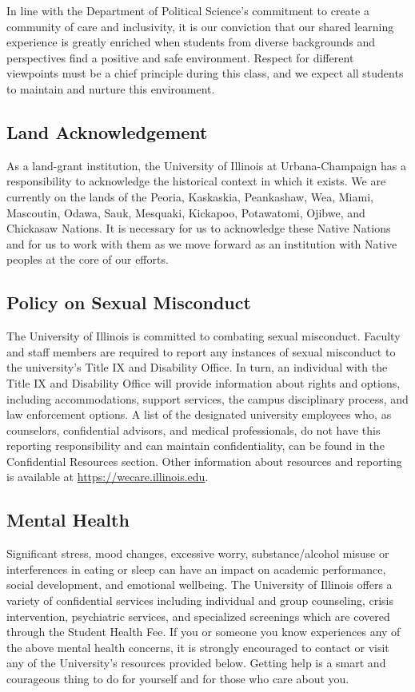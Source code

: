 \documentclass[11pt,letterpaper]{article}
\begin{document}
In line with the Department of Political Science's commitment to create a community of care and inclusivity, it is our conviction that our shared learning experience is greatly enriched when students from diverse backgrounds and perspectives find a positive and safe environment. Respect for different viewpoints must be a chief principle during this class, and we expect all students to maintain and nurture this environment.

\subsection*{Land Acknowledgement}

As a land-grant institution, the University of Illinois at Urbana-Champaign has a responsibility to acknowledge the historical context in which it exists. We are currently on the lands of the Peoria, Kaskaskia, Peankashaw, Wea, Miami, Mascoutin, Odawa, Sauk, Mesquaki, Kickapoo, Potawatomi, Ojibwe, and Chickasaw Nations. It is necessary for us to acknowledge these Native Nations and for us to work with them as we move forward as an institution with Native peoples at the core of our efforts.

\subsection*{Policy on Sexual Misconduct}

The University of Illinois is committed to combating sexual misconduct. Faculty and staff members are required to report any instances of sexual misconduct to the university's Title IX and Disability Office. In turn, an individual with the Title IX and Disability Office will provide information about rights and options, including accommodations, support services, the campus disciplinary process, and law enforcement options. A list of the designated university employees who, as counselors, confidential advisors, and medical professionals, do not have this reporting responsibility and can maintain confidentiality, can be found in the Confidential Resources section. Other information about resources and reporting is available at \href{https://wecare.illinois.edu}{https://wecare.illinois.edu}.

\subsection*{Mental Health}

Significant stress, mood changes, excessive worry, substance/alcohol misuse or interferences in eating or sleep can have an impact on academic performance, social development, and emotional wellbeing. The University of Illinois offers a variety of confidential services including individual and group counseling, crisis intervention, psychiatric services, and specialized screenings which are covered through the Student Health Fee. If you or someone you know experiences any of the above mental health concerns, it is strongly encouraged to contact or visit any of the University's resources provided below. Getting help is a smart and courageous thing to do for yourself and for those who care about you.
\end{document}
